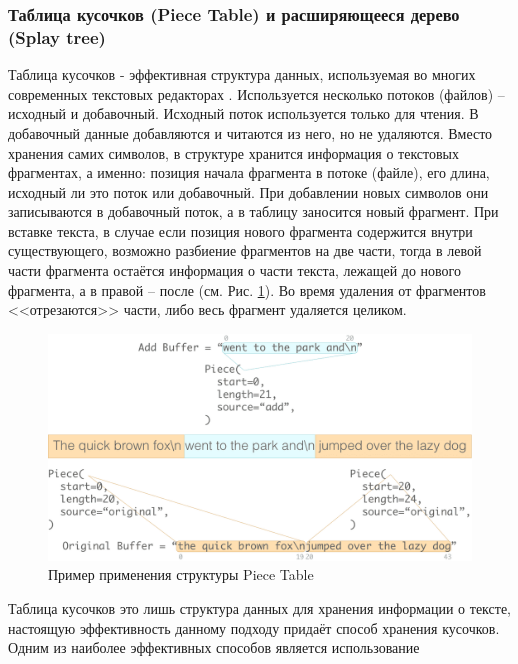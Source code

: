 \documentclass{fefu}
\begin{document}
			\subsubsection{Таблица кусочков (Piece Table) и расширяющееся дерево (Splay tree)}
				\par Таблица кусочков - эффективная структура данных, используемая во многих 
				современных текстовых редакторах \cite{PieceTableArticle}. Используется 
				несколько потоков (файлов) -- исходный и добавочный. Исходный поток 
				используется только для чтения. В добавочный данные добавляются и читаются из 
				него, но не удаляются. Вместо хранения самих символов, в структуре хранится 
				информация о текстовых фрагментах, а именно: позиция начала фрагмента в потоке 
				(файле), его длина, исходный ли это поток или добавочный. При добавлении новых 
				символов они записываются в добавочный поток, а в таблицу заносится новый 
				фрагмент. При вставке текста, в случае если позиция нового фрагмента содержится 
				внутри существующего, возможно разбиение фрагментов на две части, тогда в левой 
				части фрагмента остаётся информация о части текста, лежащей до нового 
				фрагмента, а в правой -- после (см. Рис. \ref{img:PieceTableExample}). Во время 
				удаления от фрагментов <<отрезаются>> части, либо весь фрагмент удаляется 
				целиком.
				\begin{figure}[h]
					\centering
					\includegraphics[width=1\linewidth]{images/PieceTableExample.png}
					\caption{Пример применения структуры Piece Table}
					\label{img:PieceTableExample}
				\end{figure}
				\par Таблица кусочков это лишь структура данных для хранения информации о
				тексте, настоящую эффективность данному подходу придаёт способ хранения
				кусочков. Одним из наиболее эффективных способов является использование 
\end{document}
